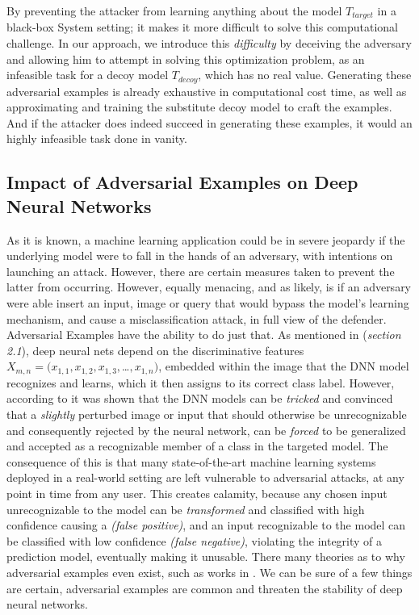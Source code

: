 \documentclass[grad,lot,lof,11pt,oneside,onehalfspace]{RUthesis}
\begin{document}
By preventing the attacker from learning anything about the model \textit{$T_{target}$} in a black-box System setting; it makes it more difficult to solve this computational challenge. In our approach, we introduce this \textit{difficulty} by deceiving the adversary and allowing him to attempt in solving this optimization problem, as an infeasible task for a decoy model \textit{$T_{decoy}$}, which has no real value. Generating these adversarial examples is already exhaustive in computational cost time, as well as approximating and training the substitute decoy model to craft the examples. And if the attacker does indeed succeed in generating these examples, it would an highly infeasible task done in vanity.
\subsection{Impact of Adversarial Examples on Deep Neural Networks}
As it is known, a machine learning application could be in severe jeopardy if the underlying model were to fall in the hands of an adversary, with intentions on launching an attack. However, there are certain measures taken to prevent the latter from occurring. However, equally menacing, and as likely, is if an adversary were able insert an input, image or query that would bypass the model's learning mechanism, and cause a misclassification attack, in full view of the defender. Adversarial Examples have the ability to do just that. As mentioned in (\textit{section 2.1}), deep neural nets depend on the discriminative features $X_{m,n} = (x_{1,1}, x_{1,2}, x_{1,3},$\ldots$,  x_{1,n})$, embedded within the image that the DNN model recognizes and learns, which it then assigns to its correct class label. However, according to \cite{nguyen_deep_2015} it was shown that the DNN models can be \textit{tricked} and convinced that a \textit{slightly} perturbed image or input that should otherwise be unrecognizable and consequently rejected by the neural network, can be \textit{forced} to be generalized and accepted as a recognizable member of a class in the targeted model. The consequence of this is that many state-of-the-art machine learning systems deployed in a real-world setting are left vulnerable to adversarial attacks, at any point in time from any user.  This creates calamity, because any chosen input unrecognizable to the model can be \textit{transformed} and  classified with high confidence causing a \textit{(false positive)}, and an input recognizable to the model can be classified with low confidence \textit{(false negative)}, violating the integrity of a prediction model, eventually making it unusable. There many theories as to why adversarial examples even exist, such as works in \cite{goodfellow_explaining_2015} \cite{papernot_transferability_2016}. We can be sure of a few things are certain, adversarial examples are common and threaten the stability of deep neural networks. \\
\end{document}

